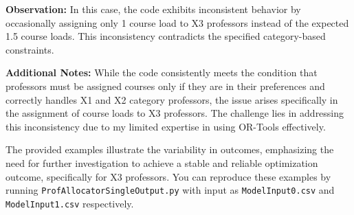 \documentclass{article}
\begin{document}
	\textbf{Observation:} In this case, the code exhibits inconsistent behavior by occasionally assigning only 1 course load to X3 professors instead of the expected 1.5 course loads. This inconsistency contradicts the specified category-based constraints.
	
	\textbf{Additional Notes:} While the code consistently meets the condition that professors must be assigned courses only if they are in their preferences and correctly handles X1 and X2 category professors, the issue arises specifically in the assignment of course loads to X3 professors. The challenge lies in addressing this inconsistency due to my limited expertise in using OR-Tools effectively.
	
	The provided examples illustrate the variability in outcomes, emphasizing the need for further investigation to achieve a stable and reliable optimization outcome, specifically for X3 professors. You can reproduce these examples by running \texttt{ProfAllocatorSingleOutput.py} with input as \texttt{ModelInput0.csv} and \texttt{ModelInput1.csv} respectively.
	
\end{document}
